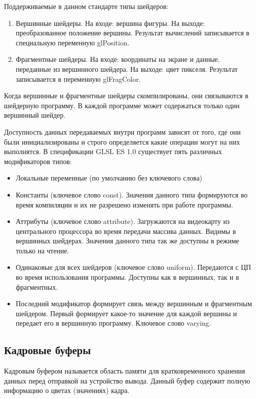 Поддерживаемые в данном стандарте типы шейдеров:

\begin{enumerate}
  \item Вершинные шейдеры. На входе: вершина фигуры. На выходе: преобразованное положение
    вершины. Результат вычислений записывается в специальную переменную gl\textunderscore{}Position.
  \item Фрагментные шейдеры. На входе: координаты на экране и данные, переданные из вершинного 
    шейдера. На выходе: цвет пикселя. Результат записывается в переменную gl\textunderscore{}FragColor.
\end{enumerate}

Когда вершинные и фрагментные шейдеры скомпилированы, они связываются в шейдерную программу.
В каждой программе может содержаться только один вершинный шейдер.

Доступность данных передаваемых внутри программ зависят от того, где они были инициализированы
и строго определяется какие операции могут на них выполнятся. В спецификации GLSL ES 1.0 
существует пять различных модификаторов типов:

\begin{itemize}
  \item Локальные переменные (по умолчанию без ключевого слова)
  \item Константы (ключевое слово const). Значения данного типа формируются во время компиляции и их не
    разрешено изменять при работе программы.
  \item Аттрибуты (ключевое слово attribute). Загружаются на видеокарту из центрального процессора во время передачи массива данных. Видимы в 
    вершинных шейдерах. Значения данного типа так же доступны в режиме только на чтение.
  \item Одинаковые для всех шейдеров (ключевое слово uniform). Передаются с ЦП во время 
    использования программы. Доступны как в вершинных, так и в фрагментных.
  \item Последний модификатор формирует связь между вершинным и фрагментным шейдером. Первый
    формирует какое-то значение для каждой вершины и передает его в вершинную программу.
    Ключевое слово varying.
\end{itemize}

\subsection{Кадровые буферы}

Кадровым буфером называется область памяти для кратковременного хранения данных перед отправкой
на устройство вывода. Данный буфер содержит полную информацию о цветах (значениях) кадра.

